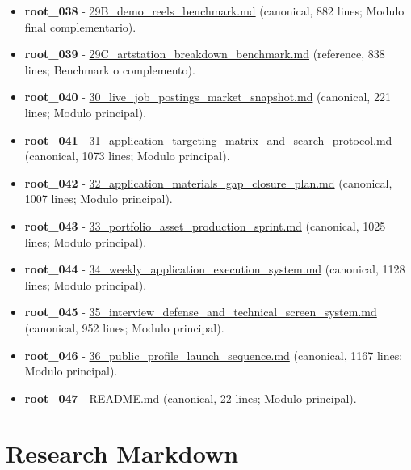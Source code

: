 \begin{itemize}
\item \textbf{root\_038} - \href{file:///E:/Laboral/29B_demo_reels_benchmark.md}{29B\_demo\_reels\_benchmark.md} (canonical, 882 lines; Modulo final complementario).
\item \textbf{root\_039} - \href{file:///E:/Laboral/29C_artstation_breakdown_benchmark.md}{29C\_artstation\_breakdown\_benchmark.md} (reference, 838 lines; Benchmark o complemento).
\item \textbf{root\_040} - \href{file:///E:/Laboral/30_live_job_postings_market_snapshot.md}{30\_live\_job\_postings\_market\_snapshot.md} (canonical, 221 lines; Modulo principal).
\item \textbf{root\_041} - \href{file:///E:/Laboral/31_application_targeting_matrix_and_search_protocol.md}{31\_application\_targeting\_matrix\_and\_search\_protocol.md} (canonical, 1073 lines; Modulo principal).
\item \textbf{root\_042} - \href{file:///E:/Laboral/32_application_materials_gap_closure_plan.md}{32\_application\_materials\_gap\_closure\_plan.md} (canonical, 1007 lines; Modulo principal).
\item \textbf{root\_043} - \href{file:///E:/Laboral/33_portfolio_asset_production_sprint.md}{33\_portfolio\_asset\_production\_sprint.md} (canonical, 1025 lines; Modulo principal).
\item \textbf{root\_044} - \href{file:///E:/Laboral/34_weekly_application_execution_system.md}{34\_weekly\_application\_execution\_system.md} (canonical, 1128 lines; Modulo principal).
\item \textbf{root\_045} - \href{file:///E:/Laboral/35_interview_defense_and_technical_screen_system.md}{35\_interview\_defense\_and\_technical\_screen\_system.md} (canonical, 952 lines; Modulo principal).
\item \textbf{root\_046} - \href{file:///E:/Laboral/36_public_profile_launch_sequence.md}{36\_public\_profile\_launch\_sequence.md} (canonical, 1167 lines; Modulo principal).
\item \textbf{root\_047} - \href{file:///E:/Laboral/README.md}{README.md} (canonical, 22 lines; Modulo principal).
\end{itemize}


\section{Research Markdown}


